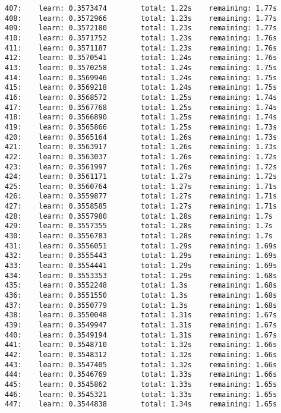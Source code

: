 \documentclass[11pt]{article}
\begin{document}
\begin{Verbatim}[commandchars=\\\{\}]
407:    learn: 0.3573474        total: 1.22s    remaining: 1.77s
408:    learn: 0.3572966        total: 1.23s    remaining: 1.77s
409:    learn: 0.3572180        total: 1.23s    remaining: 1.77s
410:    learn: 0.3571752        total: 1.23s    remaining: 1.76s
411:    learn: 0.3571187        total: 1.23s    remaining: 1.76s
412:    learn: 0.3570541        total: 1.24s    remaining: 1.76s
413:    learn: 0.3570258        total: 1.24s    remaining: 1.75s
414:    learn: 0.3569946        total: 1.24s    remaining: 1.75s
415:    learn: 0.3569218        total: 1.24s    remaining: 1.75s
416:    learn: 0.3568572        total: 1.25s    remaining: 1.74s
417:    learn: 0.3567768        total: 1.25s    remaining: 1.74s
418:    learn: 0.3566890        total: 1.25s    remaining: 1.74s
419:    learn: 0.3565866        total: 1.25s    remaining: 1.73s
420:    learn: 0.3565164        total: 1.26s    remaining: 1.73s
421:    learn: 0.3563917        total: 1.26s    remaining: 1.73s
422:    learn: 0.3563037        total: 1.26s    remaining: 1.72s
423:    learn: 0.3561997        total: 1.26s    remaining: 1.72s
424:    learn: 0.3561171        total: 1.27s    remaining: 1.72s
425:    learn: 0.3560764        total: 1.27s    remaining: 1.71s
426:    learn: 0.3559877        total: 1.27s    remaining: 1.71s
427:    learn: 0.3558585        total: 1.27s    remaining: 1.71s
428:    learn: 0.3557980        total: 1.28s    remaining: 1.7s
429:    learn: 0.3557355        total: 1.28s    remaining: 1.7s
430:    learn: 0.3556783        total: 1.28s    remaining: 1.7s
431:    learn: 0.3556051        total: 1.29s    remaining: 1.69s
432:    learn: 0.3555443        total: 1.29s    remaining: 1.69s
433:    learn: 0.3554441        total: 1.29s    remaining: 1.69s
434:    learn: 0.3553353        total: 1.29s    remaining: 1.68s
435:    learn: 0.3552248        total: 1.3s     remaining: 1.68s
436:    learn: 0.3551550        total: 1.3s     remaining: 1.68s
437:    learn: 0.3550779        total: 1.3s     remaining: 1.68s
438:    learn: 0.3550048        total: 1.31s    remaining: 1.67s
439:    learn: 0.3549947        total: 1.31s    remaining: 1.67s
440:    learn: 0.3549194        total: 1.31s    remaining: 1.67s
441:    learn: 0.3548710        total: 1.32s    remaining: 1.66s
442:    learn: 0.3548312        total: 1.32s    remaining: 1.66s
443:    learn: 0.3547405        total: 1.32s    remaining: 1.66s
444:    learn: 0.3546769        total: 1.33s    remaining: 1.66s
445:    learn: 0.3545862        total: 1.33s    remaining: 1.65s
446:    learn: 0.3545321        total: 1.33s    remaining: 1.65s
447:    learn: 0.3544838        total: 1.34s    remaining: 1.65s

\end{Verbatim}
\end{document}
